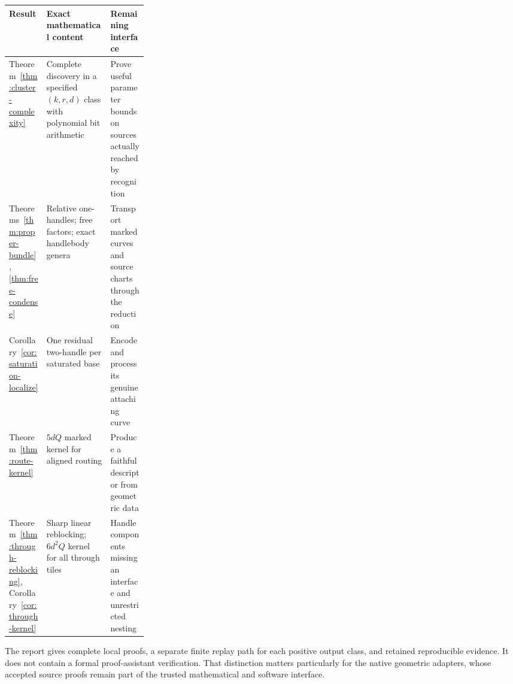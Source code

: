 \begin{center}\small
\begin{tabularx}{\linewidth}{@{}P{0.27\linewidth}YY@{}}
\toprule
Result & Exact mathematical content & Remaining interface\\
\midrule
Theorem~\ref{thm:cluster-complexity} & Complete discovery in a specified
$(k,r,d)$ class with polynomial bit arithmetic & Prove useful parameter bounds
on sources actually reached by recognition\\
Theorems~\ref{thm:proper-bundle}, \ref{thm:free-condense} & Relative one-handles;
free factors; exact handlebody genera & Transport marked curves and source
charts through the reduction\\
Corollary~\ref{cor:saturation-localize} & One residual two-handle per saturated
base & Encode and process its genuine attaching curve\\
Theorem~\ref{thm:route-kernel} & $5dQ$ marked kernel for aligned routing &
Produce a faithful descriptor from geometric data\\
Theorem~\ref{thm:through-reblocking}, Corollary~\ref{cor:through-kernel} & Sharp
linear reblocking; $6d^2Q$ kernel for all through tiles & Handle components
missing an interface and unrestricted nesting\\
\bottomrule
\end{tabularx}\end{center}

The report gives complete local proofs, a separate finite replay path for each
positive output class, and retained reproducible evidence. It does not contain
a formal proof-assistant verification. That distinction matters particularly
for the native geometric adapters, whose accepted source proofs remain part of
the trusted mathematical and software interface.
